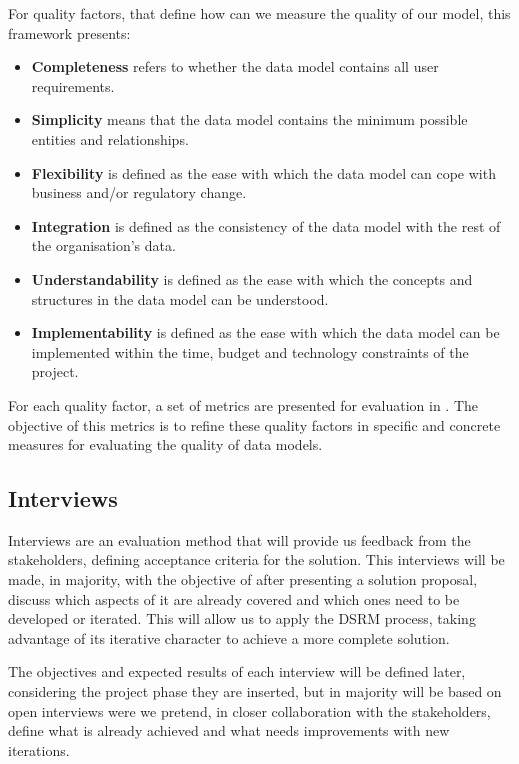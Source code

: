 For quality factors, that define how can we measure the quality of our model, this framework presents:

\begin{itemize}
\item \textbf{Completeness} refers to whether the data model contains all user requirements.
\item \textbf{Simplicity} means that the data model contains the minimum possible entities and relationships.
\item \textbf{Flexibility} is defined as the ease with which the data model can cope with business and/or regulatory change.
\item \textbf{Integration} is defined as the consistency of the data model with the rest of the organisation’s data.
\item \textbf{Understandability} is defined as the ease with which the concepts and structures in the data model can be understood.
\item \textbf{Implementability} is defined as the ease with which the data model can be implemented within the time, budget and technology constraints of the project.
\end{itemize}

For each quality factor, a set of metrics are presented for evaluation in \cite{moody1998metrics}. The objective of this metrics is to refine these quality factors in specific and concrete measures for evaluating the quality of data models. 

\subsection{Interviews}

Interviews are an evaluation method that will provide us feedback from the stakeholders, defining acceptance criteria for the solution. This interviews will be made, in majority, with the objective of after presenting a solution proposal, discuss which aspects of it are already covered and which ones need to be developed or iterated. This will allow us to apply the DSRM process, taking advantage of its iterative character to achieve a more complete solution.\par
The objectives and expected results of each interview will be defined later, considering the project phase they are inserted, but in majority will be based on open interviews were we pretend, in closer collaboration with the stakeholders, define what is already achieved and what needs improvements with new iterations.\par  

